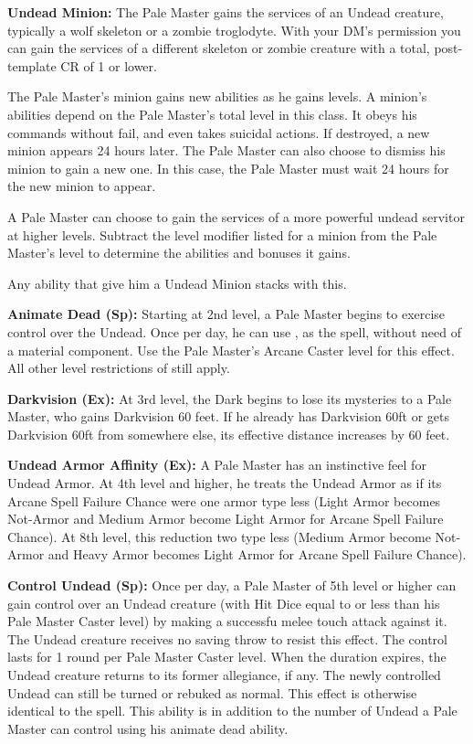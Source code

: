 \textbf{Undead Minion:} The Pale Master gains the services of an Undead creature, typically a wolf skeleton or a zombie troglodyte. With your DM's permission you can gain the services of a different skeleton or zombie creature with a total, post-template CR of 1 or lower.

The Pale Master's minion gains new abilities as he gains levels. A minion's abilities depend on the Pale Master's total level in this class. It obeys his commands without fail, and even takes suicidal actions. If destroyed, a new minion appears 24 hours later. The Pale Master can also choose to dismiss his minion to gain a new one. In this case, the Pale Master must wait 24 hours for the new minion to appear.

A Pale Master can choose to gain the services of a more powerful undead servitor at higher levels. Subtract the level modifier listed for a minion from the Pale Master's level to determine the abilities and bonuses it gains.

Any ability that give him a Undead Minion stacks with this.

\textbf{Animate Dead (Sp):} Starting at 2nd level, a Pale Master begins to exercise control over the Undead. Once per day, he can use , as the spell, without need of a material component. Use the Pale Master’s Arcane Caster level for this effect. All other level restrictions of  still apply.

\textbf{Darkvision (Ex):} At 3rd level, the Dark begins to lose its mysteries to a Pale Master, who gains Darkvision 60 feet. If he already has Darkvision 60ft or gets Darkvision 60ft from somewhere else, its effective distance increases by 60 feet.

\textbf{Undead Armor Affinity (Ex):} A Pale Master has an instinctive feel for Undead Armor. At 4th level and higher, he treats the Undead Armor as if its Arcane Spell Failure Chance were one armor type less (Light Armor becomes Not-Armor and Medium Armor become Light Armor for Arcane Spell Failure Chance). At 8th level, this reduction two type less (Medium Armor become Not-Armor and Heavy Armor becomes Light Armor for Arcane Spell Failure Chance).

\textbf{Control Undead (Sp):} Once per day, a Pale Master of 5th level or higher can gain control over an Undead creature (with Hit Dice equal to or less than his Pale Master Caster level) by
making a successfu melee touch attack against it. The Undead creature receives no saving throw to resist this effect. The control lasts for 1 round per Pale Master Caster level. When the duration expires, the Undead creature returns to its former allegiance, if any. The newly controlled Undead can still be turned or rebuked as normal. This effect is otherwise identical to the  spell. This ability is in addition to the number of Undead a Pale Master can control using his animate dead ability.


